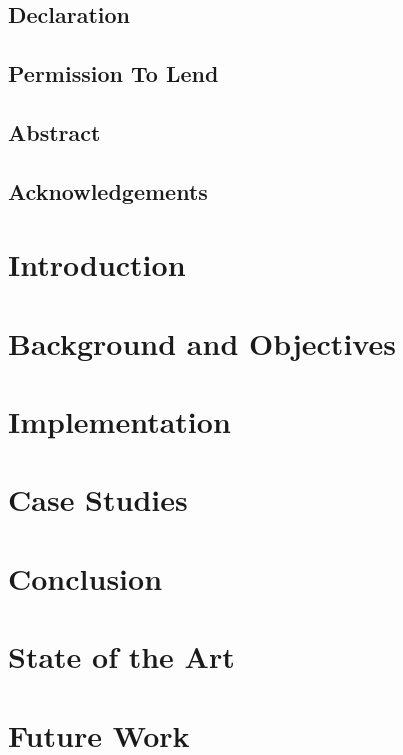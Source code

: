 \documentclass{report}
\begin{document}
	\hypersetup{pageanchor=false}
	
	\hypersetup{pageanchor=true}


	\section*{Declaration}
	
	\pagebreak

	\section*{Permission To Lend}
	
	\pagebreak

	\section*{Abstract}
	
	\pagebreak

	\section*{Acknowledgements}
	
	\pagebreak

	\tableofcontents
	\cleardoublepage

	\chapter{Introduction}
	

	\chapter{Background and Objectives}
	

	\chapter{Implementation}
	

	\chapter{Case Studies}
	

	\chapter{Conclusion}
	

	\chapter{State of the Art}
	

	\chapter{Future Work}
	

	\clearpage
	\printbibliography
\end{document}
